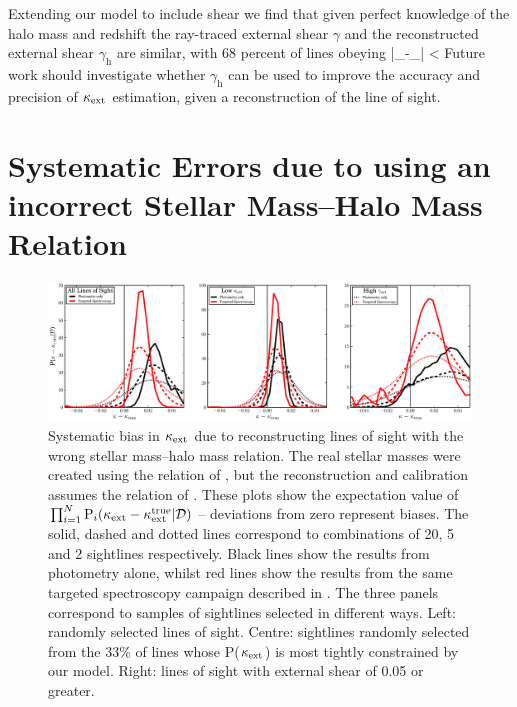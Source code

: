 \documentclass[useAMS,usenatbib,a4paper]{mn2e}
\begin{document}
Extending our model to include shear we find that given
perfect knowledge of the halo mass and redshift the ray-traced external shear
$\gamma$ and the reconstructed external shear $\gamma_{\mathrm{h}}$  are
similar, with 68 percent of lines obeying
\be
\label{eq:shearineq}
|{\pmb{\gamma}_{}-\pmb{\gamma}_{}}| < 
\ee 
Future work should investigate whether $\gamma_{\mathrm{h}}$ can be used
to improve the accuracy and precision of $\kappa_{\rm ext}$ estimation, given a
reconstruction of the line of sight. 


\section{Systematic Errors due to using an incorrect Stellar Mass--Halo Mass Relation}
\label{sec:biases}

\begin{figure}
\includegraphics[width=\textwidth]{figs/SHAMbias.eps}
\caption{Systematic bias in $\kappa_{\rm ext}$ due to reconstructing lines of sight with the wrong stellar mass--halo mass relation. The real stellar masses were created using the relation of \citet{MosterEtal2010}, but the reconstruction and calibration assumes the relation of \citet{BehrooziEtal2010}.  These plots
show the expectation value of $\prod_{i=1}^N {\rm P}_i(\kappa_{\rm ext}-\kappa_{\rm ext}^{\rm true}|{\mathcal{D}})$ --
deviations from zero represent biases. The solid, dashed and dotted lines
correspond to combinations of  20, 5 and 2 sightlines respectively. Black
lines show the results \infered from photometry alone, whilst red lines show
the results  from the same targeted spectroscopy campaign described in 
. The three panels correspond to samples of
sightlines selected in different ways. Left: randomly selected lines of
sight.  Centre: sightlines randomly selected from the 33\% of lines whose
P($\kappa_{\rm ext}$) is most tightly constrained by our model.  Right: lines of sight
with external shear of 0.05 or greater.}
\label{fig:SHAMbias}
\end{figure}
\end{document}
